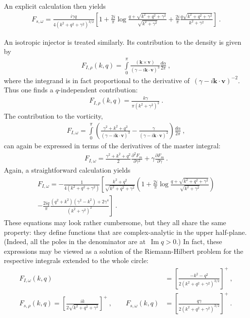 \documentclass[preprint,aps,eqsecnum]{revtex4-1}
\renewcommand{\Im}{\mathop{\mathrm{Im}}\nolimits}
\begin{document}
An explicit calculation then yields
\begin{align}
  F_{s, \omega} =
 \frac{i \gamma q}{4(k^2 + q^2 + \gamma^2)^{3/2}}
  \left[1 + \frac{2i}{\pi} \log \frac{q + \sqrt{k^2 + q^2 + \gamma^2}}{
                          \sqrt{k^2 + \gamma^2}}
  + \frac{2i}{\pi} \frac{q\sqrt{k^2 + q^2 + \gamma^2}}{k^2 + \gamma^2}
  \right]\ . 
\end{align}

An isotropic injector is treated similarly.
Its contribution to the density is given by
\begin{align}
  F_{I, \rho}(k, q) = \int\limits_{0}^{\pi} \frac{({\bm k}\times{\bm v})}{
     \left(\gamma - i {\bm k} \cdot{\bm v}\right)^3} \frac{d\alpha}{2\pi}\ , 
\end{align}
where the integrand is in fact proportional to the derivative
of~$(\gamma - i {\bm k}\cdot{\bm v})^{-2}$. Thus one finds
a $q$-independent contribution:
\begin{align}
  F_{I, \rho}(k, q) = \frac{k\gamma}{\pi (k^2 + \gamma^2)^2}\ . 
\end{align}
The contribution to the vorticity,
\begin{align}
  F_{I, \omega} = \int\limits_{0}^{\pi} \left(
  \frac{\gamma^2 + k^2 + q^2}{\left(\gamma - i {\bm k}\cdot{\bm v}\right)^3}
  - \frac{\gamma}{\left(\gamma - i {\bm k}\cdot{\bm v}\right)^2}
  \right)
  \frac{d\alpha}{2\pi}\ , 
\end{align}
can again be expressed in terms of the derivatives of the master integral:
\begin{align}
  F_{I, \omega} = \frac{\gamma^2 + k^2 + q^2}{2}
  \frac{\partial^2 F_m}{\partial \gamma^2}
  + \gamma \frac{\partial F_m}{\partial\gamma}\ . 
\end{align}
Again, a straightforward calculation yields
\begin{align}
  F_{I, \omega} = -\frac{1}{4 \left(k^2 + q^2 + \gamma^2\right)}
  \left[
  \frac{k^2 + q^2}{\sqrt{k^2 + q^2 + \gamma^2}}
  \left(
  1 + \frac{2i}{\pi} \log\frac{q + \sqrt{k^2 + q^2 + \gamma^2}}{
                           \sqrt{k^2 + \gamma^2}}
  \right) \right. \\ \nonumber
  - \left.\frac{2iq}{\pi} \frac{(q^2 + k^2)(\gamma^2 - k^2) + 2 \gamma^4}{
  (k^2 + \gamma^2)^2}
  \right]\ . 
\end{align}
These equations may look rather cumbersome, but they all share the same
property: they define functions that are complex-analytic in the upper
half-plane. (Indeed, all the poles in the denominator are at~$\Im q > 0$.)
In fact, these expressions may be viewed as a solution of the
Riemann-Hilbert problem for the respective integrals
extended to the whole circle:
\begin{align}
  F_{I, \omega}(k, q) &= \left[\frac{-k^2 - q^2}{
  2\left(k^2 + q^2 + \gamma^2\right)^{3/2}}\right]^{+}\ , \\
  F_{s, \rho}(k, q)
  = \left[\frac{ik}{2\sqrt{k^2 + q^2 + \gamma^2}}\right]^{+}\ , 
  \qquad
  F_{s, \omega}(k, q) &= \left[\frac{q\gamma}{
          2\left(k^2 + q^2 + \gamma^2\right)^{3/2}}\right]^{+}\ . 
\end{align}
\end{document}

